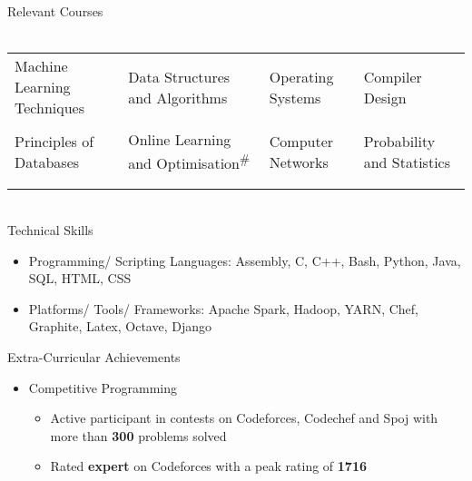 \documentclass{article}
\begin{document}
{\Large Relevant Courses}\\\\
\begin{tabular}{p{4.5cm} p{5.3cm} p{3.5cm} p{4cm}}
Machine Learning Techniques & Data Structures and Algorithms & Operating Systems & Compiler Design\\\\\vspace{-0.4cm}Principles of Databases &\vspace{-0.4cm}Online Learning and Optimisation\textsuperscript{\#}  &\vspace{-0.4cm}Computer Networks & \vspace{-0.4cm}Probability and Statistics\\\\\vspace{-0.65cm}& \vspace{-0.65cm}& \vspace{-0.65cm}& \vspace{-0.65cm}{\small{\#} : \emph{Ongoing}}
\end{tabular}\vspace{-0.6cm}\\
{\Large Technical Skills}
\renewcommand{\labelitemi}{$\bullet$}
\begin{itemize}[leftmargin=0.82cm]
\item Programming/ Scripting Languages: Assembly, C, C++, Bash, Python, Java, SQL, HTML, CSS
\item Platforms/ Tools/ Frameworks: Apache Spark, Hadoop, YARN,  Chef, Graphite, Latex, Octave, Django
\end{itemize}
\renewcommand{\labelitemii}{$\bullet$}
{\Large Extra-Curricular Achievements}
\begin{itemize}[leftmargin=0.07cm]
\item[] {\large Competitive Programming}
	\begin{itemize}
	\item Active participant in contests on Codeforces, Codechef and Spoj with more than \textbf{300} problems solved
	\item Rated \textbf{expert} on Codeforces with a peak rating of \textbf{1716}
	\end{itemize}
\end{itemize}
\end{document}
